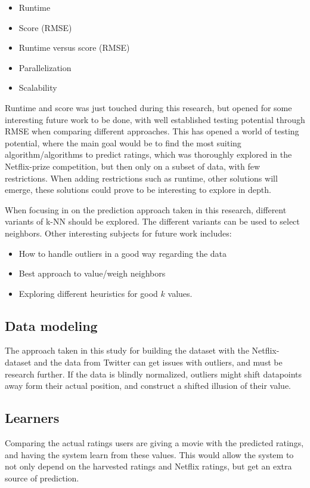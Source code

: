 \begin{itemize}
    \item Runtime
    \item Score (RMSE)
    \item Runtime versus score (RMSE)
    \item Parallelization
    \item Scalability
\end{itemize}

Runtime and score was just touched during this research, but opened for some interesting future work to be done, with well established testing potential through RMSE when comparing different approaches. This has opened a world of testing potential, where the main goal would be to find the most suiting algorithm/algorithms to predict ratings, which was thoroughly explored in the Netflix-prize competition, but then only on a subset of data, with few restrictions. When adding restrictions such as runtime, other solutions will emerge, these solutions could prove to be interesting to explore in depth.

When focusing in on the prediction approach taken in this research, different variants of k-NN should be explored. The different variants can be used to select neighbors. Other interesting subjects for future work includes:

\begin{itemize}
    \item How to handle outliers in a good way regarding the data
    \item Best approach to value/weigh neighbors
    \item Exploring different heuristics for good $k$ values.
\end{itemize}



\subsection{Data modeling}
The approach taken in this study for building the dataset with the Netflix-dataset and the data from Twitter can get issues with outliers, and must be research further. If the data is blindly normalized, outliers might shift datapoints away form their actual position, and construct a shifted illusion of their value.


\subsection{Learners}
Comparing the actual ratings users are giving a movie with the predicted ratings, and having the system learn from these values. This would allow the system to not only depend on the harvested ratings and Netflix ratings, but get an extra source of prediction.


